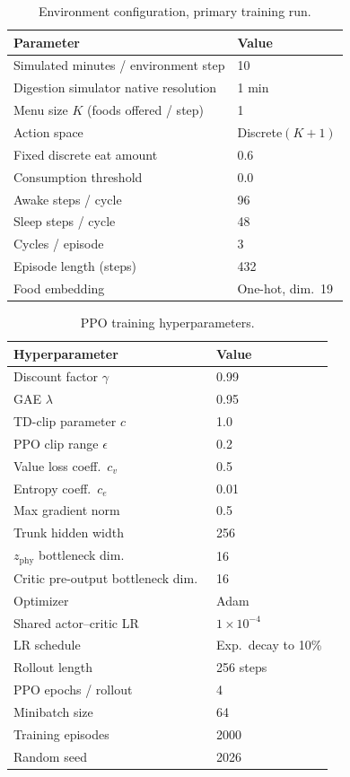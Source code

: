 \documentclass[10pt,twocolumn]{article}
\begin{document}
\begin{table}[t]
\centering
\small
\caption{Environment configuration, primary training run.}
\label{tab:env-hparams}
\begin{tabular}{@{}p{5.1cm}l@{}}
\toprule
Parameter & Value \\
\midrule
Simulated minutes / environment step & 10 \\
Digestion simulator native resolution & 1 min \\
Menu size $K$ (foods offered / step) & 1 \\
Action space & Discrete$(K{+}1)$ \\
Fixed discrete eat amount & 0.6 \\
Consumption threshold & 0.0 \\
Awake steps / cycle & 96 \\
Sleep steps / cycle & 48 \\
Cycles / episode & 3 \\
Episode length (steps) & 432 \\
Food embedding & One-hot, dim.\ 19 \\
\bottomrule
\end{tabular}
\end{table}

\begin{table}[t]
\centering
\small
\caption{PPO training hyperparameters.}
\label{tab:train-hparams}
\begin{tabular}{@{}p{5.1cm}l@{}}
\toprule
Hyperparameter & Value \\
\midrule
Discount factor $\gamma$ & 0.99 \\
GAE $\lambda$ & 0.95 \\
TD-clip parameter $c$ & 1.0 \\
PPO clip range $\epsilon$ & 0.2 \\
Value loss coeff.\ $c_v$ & 0.5 \\
Entropy coeff.\ $c_e$ & 0.01 \\
Max gradient norm & 0.5 \\
Trunk hidden width & 256 \\
$z_\text{phy}$ bottleneck dim.\ & 16 \\
Critic pre-output bottleneck dim.\ & 16 \\
Optimizer & Adam \\
Shared actor--critic LR & $1\times10^{-4}$ \\
LR schedule & Exp.\ decay to 10\% \\
Rollout length & 256 steps \\
PPO epochs / rollout & 4 \\
Minibatch size & 64 \\
Training episodes & 2000 \\
Random seed & 2026 \\
\bottomrule
\end{tabular}
\end{table}
\end{document}

